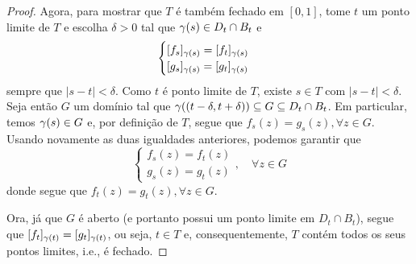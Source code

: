 \begin{proof}
        Agora, para mostrar que $T$ é também fechado em $[0,1]$, tome $t$ um ponto 
        limite de $T$ e escolha $\delta>0$ tal que $\gamma(s) \in D_t\cap B_t$ e
        \begin{equation*}
            \begin{cases}
                [f_s]_{\gamma(s)} = [f_t]_{\gamma(s)} \\
                [g_s]_{\gamma(s)} = [g_t]_{\gamma(s)}
            \end{cases}
        \end{equation*}
        sempre que $|s-t|<\delta$. Como $t$ é ponto limite de $T$, existe $s\in T$ com
        $|s-t|<\delta$. Seja então $G$ um domínio tal que 
        $\gamma((t-\delta, t+\delta))\subseteq G\subseteq D_t\cap B_t$.
        Em particular, temos $\gamma(s)\in G$ e, por definição de $T$, segue que
        $f_s(z) = g_s(z), \forall z\in G$. Usando novamente as duas igualdades anteriores, 
        podemos garantir que
        \begin{equation*}
            \begin{cases}
                f_s(z) = f_t(z) \\
                g_s(z) = g_t(z)
            \end{cases}, \quad\forall z\in G
        \end{equation*}
        donde segue que $f_t(z) = g_t(z), \forall z\in G$. 
        
        Ora, já que $G$ é aberto 
        (e portanto possui um ponto limite em $D_t\cap B_t$), segue que 
        $[f_t]_{\gamma(t)} = [g_t]_{\gamma(t)}$, ou seja, $t\in T$ e, consequentemente,
        $T$ contém todos os seus pontos limites, i.e., é fechado.
    \end{proof}


